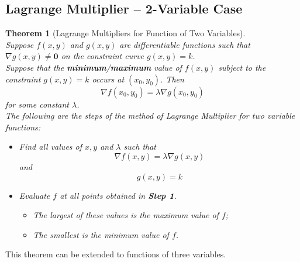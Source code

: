 \documentclass[12pt]{article}
\newtheorem{theorem}{Theorem}[section]
\theoremstyle{definition}
\newcommand\ve[1]{\mathbf{#1}}
\begin{document}
\subsection{Lagrange Multiplier -- 2-Variable Case}
\begin{theorem}[Lagrange Multipliers for Function of Two Variables]
\hfill\\\normalfont Suppose $f(x,y)$ and $g(x,y)$ are differentiable functions such that $\nabla g(x,y)\neq \ve{0}$ on the constraint curve $g(x,y)=k$.\\
Suppose that the \textbf{minimum}/\textbf{maximum} value of $f(x,y)$ subject to the constraint $g(x,y)=k$ occurs at $(x_0,y_0)$. Then
\[
\nabla f(x_0,y_0)=\lambda\nabla g(x_0,y_0)
\]
for some constant $\lambda$.\\
The following are the steps of the method of Lagrange Multiplier for two variable functions:
\begin{itemize}
  \item[Step 1] Find all values of $x,y$ and $\lambda$ such that
  \[
  \nabla f(x,y)=\lambda\nabla g(x,y)
  \]
  and
  \[
g(x,y)=k
  \]
  \item[Step 2] Evaluate $f$ at all points obtained in \textbf{Step 1}.
  \begin{itemize}
    \item The largest of these values is the maximum value of $f$;
    \item The smallest is the minimum value of $f$.
  \end{itemize}
\end{itemize}
\end{theorem}
This theorem can be extended to functions of three variables.
\clearpage
\end{document}

